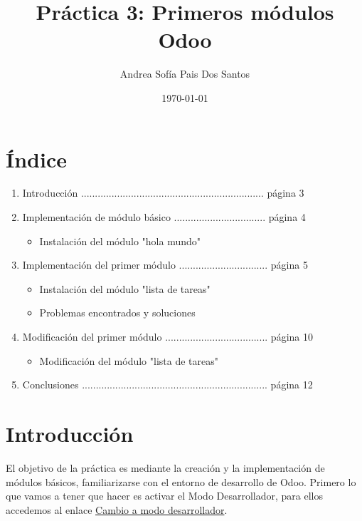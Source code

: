 \documentclass[a4paper,12pt]{article}
\title{Práctica 3: Primeros módulos Odoo}
\author{Andrea Sofía Pais Dos Santos}
\date{\today}
\begin{document}
\setlength{\droptitle}{0.4\textheight} 
\maketitle
\thispagestyle{empty}
\newpage 


\vspace{7cm}

\section{Índice}

\begin{enumerate}[start=2]
    \item Introducción  .................................................................. página 3
    \item Implementación de módulo básico ................................. página 4
    \begin{itemize}
    \item Instalación del módulo "hola mundo"
    \end{itemize}
    \item Implementación del primer módulo ................................ página 5
    \begin{itemize}
    \item Instalación del módulo "lista de tareas"
    \item Problemas encontrados y soluciones
    \end{itemize}
    \item Modificación del primer módulo ..................................... página 10
    \begin{itemize}
    \item Modificación del módulo "lista de tareas"
    \end{itemize}
    \item Conclusiones ................................................................... página 12
\end{enumerate}
\newpage


\section{Introducción}

El objetivo de la práctica es mediante la creación y la implementación de módulos básicos, familiarizarse con el entorno de desarrollo de Odoo. Primero lo que
vamos a tener que hacer es activar el Modo Desarrollador, para ellos accedemos al enlace \href{https://www.odoo.com/documentation/17.0/es/applications/general/developer_mode.html}{Cambio a modo desarrollador}.
\end{document}
